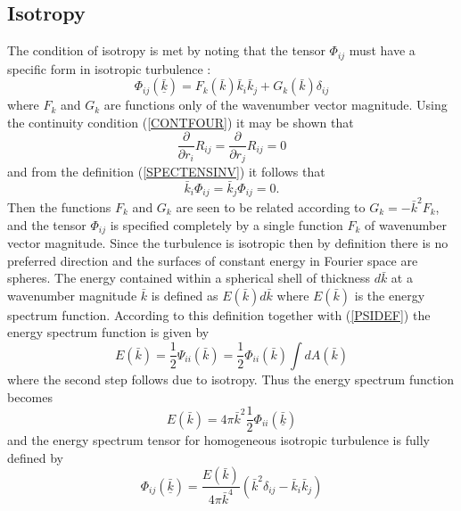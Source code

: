 \documentclass[dvips]{article}
\begin{document}
\subsection{Isotropy}
The condition of isotropy is met by noting that the tensor $\Phi_{ij}$
must have a specific form in isotropic turbulence \cite{batchelor53}:
\begin{equation}
\Phi_{ij}(\underline{\bar{k}}) = F_{k}(\bar{k})\bar{k}_{i}\bar{k}_{j} +
G_{k}(\bar{k})\delta_{ij}
\end{equation}
where $F_{k}$ and $G_{k}$ are functions only of the wavenumber
vector magnitude.  Using the continuity condition (\ref{CONTFOUR}) it may
be shown that
\begin{equation}
\frac{\partial}{\partial r_{i}}R_{ij} =
\frac{\partial}{\partial r_{j}}R_{ij} = 0
\label{CONTVELCOR}
\end{equation}
and from the definition (\ref{SPECTENSINV}) it follows that
\begin{equation}
\bar{k}_{i}\Phi_{ij} =
\bar{k}_{j}\Phi_{ij} = 0.
\label{CONTSPECTENS}
\end{equation}
Then the functions $F_{k}$ and $G_{k}$ are seen to be related according to
$G_{k} = -\bar{k}^{2}F_{k}$, and the tensor $\Phi_{ij}$ 
is specified completely by a single function $F_{k}$ of wavenumber vector
magnitude.  Since the turbulence is isotropic then by definition
there is no preferred direction and the surfaces of constant
energy in Fourier space are spheres.  The energy contained within a
spherical shell of thickness $d\bar{k}$ at a wavenumber magnitude
$\bar{k}$ is defined as $E(\bar{k})d\bar{k}$ where $E(\bar{k})$ is the
energy spectrum function.  According
to this definition together with (\ref{PSIDEF}) the energy spectrum
function is given by
\begin{equation}
E(\bar{k}) = \frac{1}{2}\Psi_{ii}(\bar{k}) =
\frac{1}{2}\Phi_{ii}(\bar{k})\int dA(\bar{k})
\end{equation}
where the second step follows due to isotropy.  Thus 
the energy spectrum function becomes 
\begin{equation}
E(\bar{k}) = 4\pi \bar{k}^{2} \frac{1}{2}\Phi_{ii}(\underline{\bar{k}})
\label{ESPECT}
\end{equation}
and the energy spectrum tensor for homogeneous isotropic turbulence 
is fully defined by
\begin{equation}
\Phi_{ij}(\underline{\bar{k}}) = \frac{E(\bar{k})}{4\pi
\bar{k}^{4}}(\bar{k}^{2}\delta_{ij}-\bar{k}_{i}\bar{k}_{j})
\label{SPECISO}
\end{equation}
\end{document}
